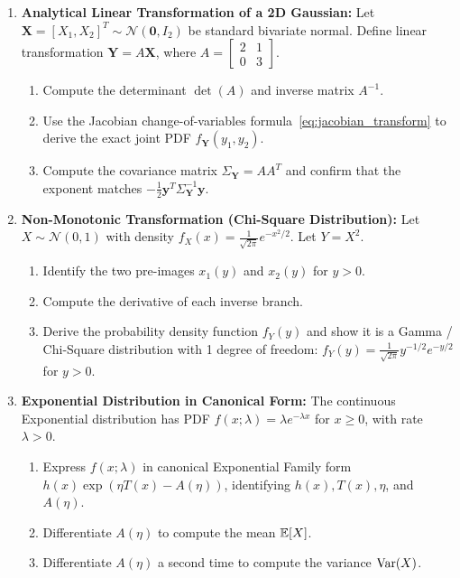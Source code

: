 \begin{enumerate}[label=\textbf{P\arabic*.}]
    \item \textbf{Analytical Linear Transformation of a 2D Gaussian:}
    Let $\mathbf{X} = [X_1, X_2]^T \sim \mathcal{N}(\mathbf{0}, I_2)$ be standard bivariate normal.
    Define linear transformation $\mathbf{Y} = A\mathbf{X}$, where $A = \begin{bmatrix} 2 & 1 \\ 0 & 3 \end{bmatrix}$.
    \begin{enumerate}[label=(\alph*)]
        \item Compute the determinant $\det(A)$ and inverse matrix $A^{-1}$.
        \item Use the Jacobian change-of-variables formula~\eqref{eq:jacobian_transform} to derive the exact joint PDF $f_{\mathbf{Y}}(y_1, y_2)$.
        \item Compute the covariance matrix $\Sigma_{\mathbf{Y}} = A A^T$ and confirm that the exponent matches $-\frac{1}{2}\mathbf{y}^T \Sigma_{\mathbf{Y}}^{-1}\mathbf{y}$.
    \end{enumerate}

    \item \textbf{Non-Monotonic Transformation (Chi-Square Distribution):}
    Let $X \sim \mathcal{N}(0, 1)$ with density $f_X(x) = \frac{1}{\sqrt{2\pi}}e^{-x^2/2}$. Let $Y = X^2$.
    \begin{enumerate}[label=(\alph*)]
        \item Identify the two pre-images $x_1(y)$ and $x_2(y)$ for $y > 0$.
        \item Compute the derivative of each inverse branch.
        \item Derive the probability density function $f_Y(y)$ and show it is a Gamma / Chi-Square distribution with 1 degree of freedom: $f_Y(y) = \frac{1}{\sqrt{2\pi}} y^{-1/2} e^{-y/2}$ for $y > 0$.
    \end{enumerate}

    \item \textbf{Exponential Distribution in Canonical Form:}
    The continuous Exponential distribution has PDF $f(x; \lambda) = \lambda e^{-\lambda x}$ for $x \ge 0$, with rate $\lambda > 0$.
    \begin{enumerate}[label=(\alph*)]
        \item Express $f(x; \lambda)$ in canonical Exponential Family form $h(x)\exp(\eta T(x) - A(\eta))$, identifying $h(x), T(x), \eta$, and $A(\eta)$.
        \item Differentiate $A(\eta)$ to compute the mean $\operatorname{\mathbb{E}}[X]$.
        \item Differentiate $A(\eta)$ a second time to compute the variance $\operatorname{Var}(X)$.
    \end{enumerate}


\end{enumerate}
